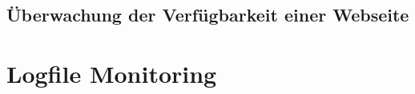 \documentclass[12pt,a4paper,parskip,listof=totoc,bibliography=totoc]{scrreprt}
\begin{document}
	\subsection{Überwachung der Verfügbarkeit einer Webseite}
	\section{Logfile Monitoring}
	
	\printbibliography 
	\printglossary[title=Abkürzungsverzeichnis, type=\acronymtype] %
	\listoffigures %
\end{document}
